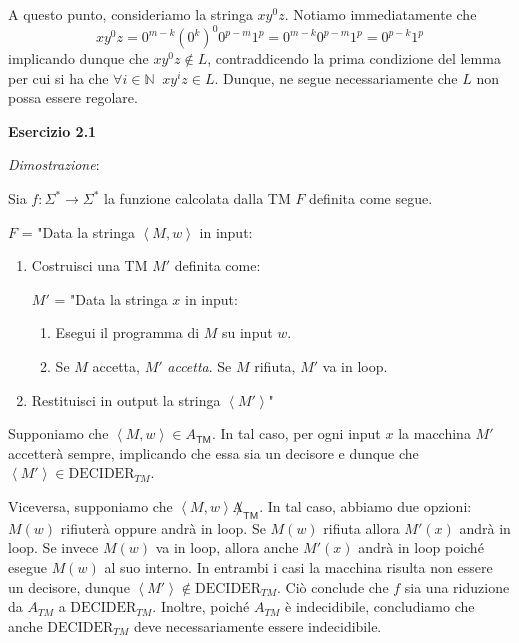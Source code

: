 \documentclass[12pt,a4paper]{report}
\theoremstyle{definition}
\newcommand{\abk}[1]{\left\langle#1\right\rangle}
\newcommand{\N}{\mathbb{N}}
\newcommand{\func}[3]{#1 : #2 \to #3}
\begin{document}
        A questo punto, consideriamo la stringa $xy^0z$. Notiamo immediatamente che
        \[xy^0z = 0^{m-k} (0^k)^0 0^{p-m}1^{p} = 0^{m-k} 0^{p-m}1^{p} = 0^{p-k} 1^p\]
        implicando dunque che $xy^0z \notin L$, contraddicendo la prima condizione del lemma per cui si ha che $\forall i \in \N \;\; xy^iz \in L$. Dunque, ne segue necessariamente che $L$ non possa essere regolare.


        \newpage

        \textbf{Esercizio 2.1}

        \textit{Dimostrazione}:

        Sia $\func{f}{\Sigma^*}{\Sigma^*}$ la funzione calcolata dalla \textsf{TM} $F$ definita come segue.
            
        $F$ = "Data la stringa $\abk{M,w}$ in input:
        \begin{enumerate}[label={\arabic*. }]
            \item Costruisci una \textsf{TM} $M'$ definita come:
            
            $M'$ = "Data la stringa $x$ in input:
            \begin{enumerate}[label={\roman*. }]
                \item Esegui il programma di $M$ su input $w$.
                \item Se $M$ accetta, $M'$ \textit{accetta}. Se $M$ rifiuta, $M'$ va in loop.
            \end{enumerate}
            \item Restituisci in output la stringa $\abk{M'}$"
        \end{enumerate}

        Supponiamo che $\abk{M,w} \in A_\textsf{TM}$. In tal caso, per ogni input $x$ la macchina $M'$ accetterà sempre, implicando che essa sia un decisore e dunque che $\abk{M'} \in \mathrm{DECIDER}_{TM}$.

        Viceversa, supponiamo che $\abk{M,w} \not A_\textsf{TM}$. In tal caso, abbiamo due opzioni: $M(w)$ rifiuterà oppure andrà in loop. Se $M(w)$ rifiuta allora $M'(x)$ andrà in loop. Se invece $M(w)$ va in loop, allora anche $M'(x)$ andrà in loop poiché esegue $M(w)$ al suo interno. In entrambi i casi la macchina risulta non essere un decisore, dunque $\abk{M'} \notin \mathrm{DECIDER}_{TM}$. Ciò conclude che $f$ sia una riduzione da $A_{TM}$ a $\mathrm{DECIDER}_{TM}$. Inoltre, poiché $A_{TM}$ è indecidibile, concludiamo che anche $\mathrm{DECIDER}_{TM}$ deve necessariamente essere indecidibile.
\end{document}
